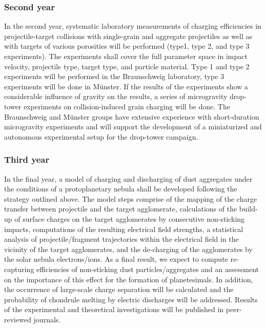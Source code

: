 \subsubsection{Second year}
In the second year, systematic laboratory measurements of charging
efficiencies in projectile-target collisions with single-grain and
aggregate projectiles as well as with targets of various
porosities will be performed (type1, type 2, and type 3
experiments). The experiments shall cover the full parameter space
in impact velocity, projectile type, target type, and particle
material. Type 1 and type 2 experiments will be performed in the
Braunschweig laboratory, type 3 experiments will be done in
M\"unster. If the results of the experiments show a considerable
influence of gravity on the results, a series of microgravity
drop-tower experiments on collision-induced grain charging will be
done. The Braunschweig and M\"unster groups have extensive
experience with short-duration microgravity experiments and will
support the development of a miniaturized and autonomous
experimental setup for the drop-tower campaign.

\subsubsection{Third year}
In the final year, a model of charging and discharging of dust
aggregates under the conditions of a protoplanetary nebula shall
be developed following the strategy outlined above. The model
steps comprise of the mapping of the charge transfer between
projectile and the target agglomerate, calculations of the
build-up of surface charges on the target agglomerates by
consecutive non-sticking impacts, computations of the resulting
electrical field strengths, a statistical analysis of
projectile/fragment trajectories within the electrical field in
the vicinity of the target agglomerates, and the de-charging of
the agglomerates by the solar nebula electrons/ions. As a final
result, we expect to compute re-capturing efficiencies of
non-sticking dust particles/aggregates and an assessment on the
importance of this effect for the formation of planetesimals. In
addition, the occurrence of large-scale charge separation will be
calculated and the probability of chondrule melting by electric
discharges will be addressed. Results of the experimental and
theoretical investigations will be published in peer-reviewed
journals.


